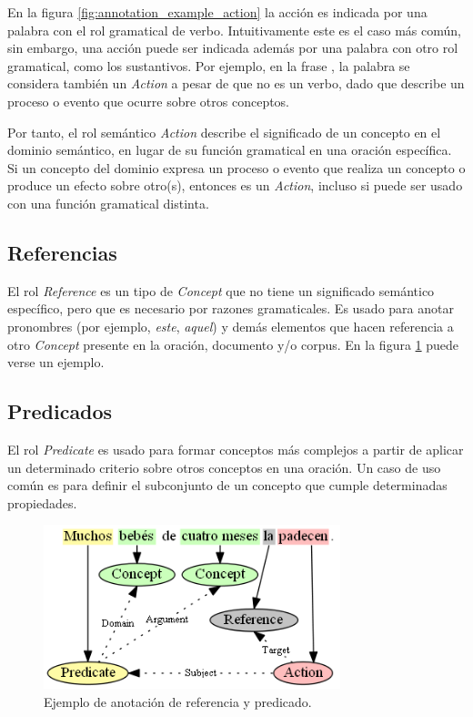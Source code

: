 En la figura \ref{fig:annotation_example_action} la acción es indicada por una palabra con el rol gramatical de verbo. Intuitivamente este es el caso más común, sin embargo, una acción puede ser indicada además por una palabra con otro rol gramatical, como los sustantivos. Por ejemplo, en la frase , la palabra  se considera también un \textit{Action} a pesar de que no es un verbo, dado que describe un proceso o evento que ocurre sobre otros conceptos.

Por tanto, el rol semántico \textit{Action} describe el significado de un concepto en el dominio semántico, en lugar de su función gramatical en una oración específica. Si un concepto del dominio expresa un proceso o evento que realiza un concepto o produce un efecto sobre otro(s), entonces es un \textit{Action}, incluso si puede ser usado con una función gramatical distinta.

\subsection{Referencias}
El rol \textit{Reference} es un tipo de \textit{Concept} que no tiene un significado semántico específico, pero que es necesario por razones gramaticales. Es usado para anotar pronombres (por ejemplo, \textit{este}, \textit{aquel}) y demás elementos que hacen referencia a otro \textit{Concept} presente en la oración, documento y/o corpus. En la figura \ref{fig:annotation_example_reference_and_predicate} puede verse un ejemplo.

\subsection{Predicados}
El rol \textit{Predicate} es usado para formar conceptos más complejos a partir de aplicar un determinado criterio sobre otros conceptos en una oración. Un caso de uso común es para definir el subconjunto de un concepto que cumple determinadas propiedades.

\begin{figure}[H]
	\begin{center}
		\includegraphics[width=3.4in]{graphics/annotation_example_reference_and_predicate.png}
		\caption[Anotación de referencia y predicado]{Ejemplo de anotación de referencia y predicado.}
		\label{fig:annotation_example_reference_and_predicate}
	\end{center}
\end{figure}

